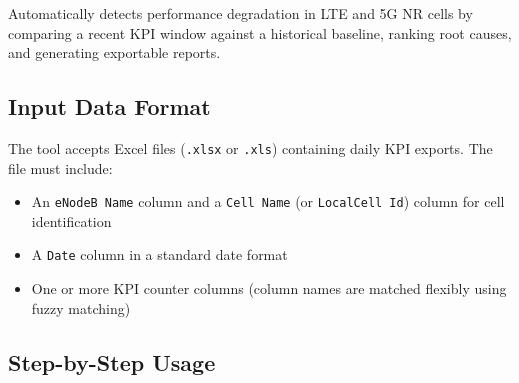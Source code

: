 Automatically detects performance degradation in LTE and 5G NR cells by comparing a recent KPI window against a historical baseline, ranking root causes, and generating exportable reports.

\subsection{Input Data Format}

The tool accepts Excel files (\texttt{.xlsx} or \texttt{.xls}) containing daily KPI exports. The file must include:

\begin{itemize}
    \item An \texttt{eNodeB Name} column and a \texttt{Cell Name} (or \texttt{LocalCell Id}) column for cell identification
    \item A \texttt{Date} column in a standard date format
    \item One or more KPI counter columns (column names are matched flexibly using fuzzy matching)
\end{itemize}

\subsection{Step-by-Step Usage}

